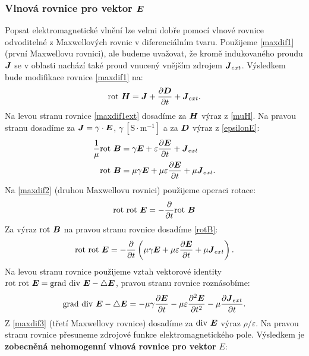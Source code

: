 \documentclass[12pt,a4paper,oneside]{article}
\numberwithin{equation}{section} %
\numberwithin{figure}{section} %
\numberwithin{table}{section} %
\renewcommand{\vec}[1]{\mbox{\boldmath$#1$}} %
\newcommand{\grad}{\mathrm{grad}\ }
\newcommand{\rot}{\mathrm{rot}\ }
\renewcommand{\div}{\mathrm{div}\ }
\begin{document}
\subsubsection*{Vlnová rovnice pro vektor $\vec{E}$}
Popsat elektromagnetické vlnění lze velmi dobře pomocí vlnové rovnice odvoditelné z Maxwellových rovnic v diferenciálním tvaru. Použijeme \ref{maxdif1} (první Maxwellovu rovnici), ale budeme uvažovat, že kromě indukovaného proudu $\vec{J}$ se v oblasti nachází také proud vnucený vnějším zdrojem $\vec{J} _{ext}$. Výsledkem bude modifikace rovnice \ref{maxdif1} na:
\begin{equation}
\label{maxdif1ext}
\rot \vec{H} = \vec{J} + \frac{\partial \vec{D}}{\partial t} + \vec{J} _{ext} .
\end{equation}
Na levou stranu rovnice \ref{maxdif1ext} dosadíme za $\vec{H}$ výraz z \ref{muH}. Na pravou stranu dosadíme za $\vec{J} = \gamma \cdot \vec{E}$, $\gamma ~\mathrm{[S \cdot m^{-1}]}$ a za $\vec{D}$ výraz z \ref{epsilonE}:
\begin{subequations}
\begin{align}
\frac{1}{\mu} \rot \vec{B} &= \gamma \vec{E} + \varepsilon \frac{\partial \vec{E}}{\partial t} + \vec{J} _{ext}
\\
\label{rotB}
\rot \vec{B} &= \mu \gamma \vec{E} + \mu \varepsilon \frac{\partial \vec{E}}{\partial t} + \mu \vec{J} _{ext} .
\end{align}
\end{subequations}
Na \ref{maxdif2} (druhou Maxwellovu rovnici) použijeme operaci rotace:
\begin{equation}
\rot \rot \vec{E} = - \frac{\partial}{\partial t} \rot \vec{B}
\end{equation}
Za výraz $\rot \vec{B}$ na pravou stranu rovnice dosadíme \ref{rotB}:
\begin{equation}
\rot \rot \vec{E} = - \frac{\partial}{\partial t} \left( \mu \gamma \vec{E} + \mu \varepsilon \frac{\partial \vec{E}}{\partial t} + \mu \vec{J} _{ext} \right) .
\end{equation}
Na levou stranu rovnice použijeme vztah vektorové identity $\rot \rot \vec{E} =  \grad \div \vec{E} - \triangle \vec{E}$, pravou stranu rovnice roznásobíme:
\begin{equation}
\grad \div \vec{E} - \triangle \vec{E} = - \mu \gamma \frac{\partial \vec{E}}{\partial t} - \mu \varepsilon \frac{\partial ^2 \vec{E}}{\partial t^2} - \mu \frac{\partial \vec{J} _{ext}}{\partial t} .
\end{equation}
Z \ref{maxdif3} (třetí Maxwellovy rovnice) dosadíme za $\div \vec{E}$ výraz $\rho / \varepsilon$. Na pravou stranu rovnice přesuneme zdrojové funkce elektromagnetického pole. Výsledkem je \textbf{zobecněná nehomogenní vlnová rovnice pro vektor} \vec{E}:
\end{document}

